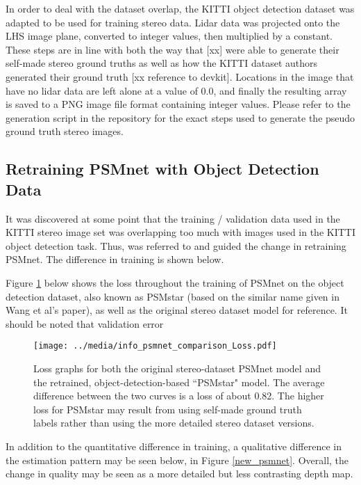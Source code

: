 In order to deal with the dataset overlap, the KITTI object detection dataset was adapted to be used for training stereo data. Lidar data was projected onto the LHS image plane, converted to integer values, then multiplied by a constant. These steps are in line with both the way that [xx] were able to generate their self-made stereo ground truths as well as how the KITTI dataset authors generated their ground truth [xx reference to devkit]. Locations in the image that have no lidar data are left alone at a value of 0.0, and finally the resulting array is saved to a PNG image file format containing integer values. Please refer to the generation script in the repository for the exact steps used to generate the pseudo ground truth stereo images.

\subsection{Retraining PSMnet with Object Detection Data}
It was discovered at some point that the training / validation data used in the KITTI stereo image set was overlapping too much with images used in the KITTI object detection task. Thus, \cite{wang_pseudo-lidar_2019} was referred to and guided the change in retraining PSMnet. The difference in training is shown below.

Figure \ref{psmnet_star_train_info} below shows the loss throughout the training of PSMnet on the object detection dataset, also known as PSMstar (based on the similar name given in Wang et al's paper), as well as the original stereo dataset model for reference. It should be noted that validation error



\begin{figure}[ht]
	\centering
	\texttt{[image: ../media/info\_psmnet\_comparison\_Loss.pdf]}
	\caption{Loss graphs for both the original stereo-dataset PSMnet model and the retrained, object-detection-based ``PSMstar" model. The average difference between the two curves is a loss of about 0.82. The higher loss for PSMstar may result from using self-made ground truth labels rather than using the more detailed stereo dataset versions.}
	\label{psmnet_star_train_info}
\end{figure}

In addition to the quantitative difference in training, a qualitative difference in the estimation pattern may be seen below, in Figure \ref{new_psmnet}. Overall, the change in quality may be seen as a more detailed but less contrasting depth map.

